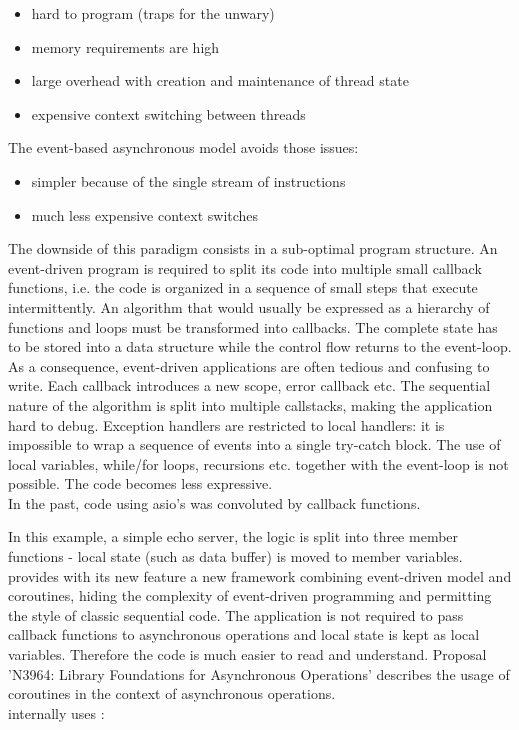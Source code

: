 \begin{itemize}
    \item hard to program (traps for the unwary)
    \item memory requirements are high
    \item large overhead with creation and maintenance of thread state
    \item expensive context switching between threads
\end{itemize}

The event-based asynchronous model avoids those issues:

\begin{itemize}
    \item simpler because of the single stream of instructions
    \item much less expensive context switches
\end{itemize}

The downside of this paradigm consists in a sub-optimal program
structure. An event-driven program is required to split its code into
multiple small callback functions, i.e. the code is organized in a sequence of
small steps that execute intermittently. An algorithm that would usually be
expressed as a hierarchy of functions and loops must be transformed into
callbacks. The complete state has to be stored into a data structure while the
control flow returns to the event-loop.\\
As a consequence, event-driven applications are often tedious and confusing to
write. Each callback introduces a new scope, error callback etc. The
sequential nature of the algorithm is split into multiple callstacks,
making the application hard to debug. Exception handlers are restricted to
local handlers: it is impossible to wrap a sequence of events into a single
try-catch block.
The use of local variables, while/for loops, recursions etc. together with the
event-loop is not possible. The code becomes less expressive.\\
\newline
In the past, code using asio's \asyncops was convoluted by
callback functions.

In this example, a simple echo server, the logic is split into three member
functions - local state (such as data buffer) is moved to member variables.\\
\newline
\boostasio provides with its new \asyncres feature a new
framework combining event-driven model and coroutines, hiding the complexity
of event-driven programming and permitting the style of classic sequential code.
The application is not required to pass callback functions to asynchronous
operations and local state is kept as local variables. Therefore the code
is much easier to read and understand.
Proposal 'N3964: Library Foundations for Asynchronous Operations'\cite{n3964}
describes the usage of coroutines in the context of asynchronous operations.\\
\yieldcontext internally uses \boostcoroutine:

